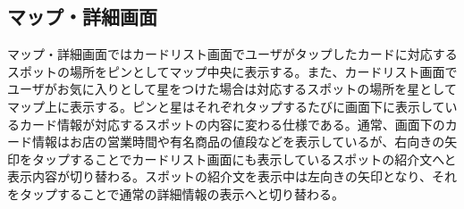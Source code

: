 \subsection{マップ・詳細画面}
マップ・詳細画面ではカードリスト画面でユーザがタップしたカードに対応するスポットの場所をピンとしてマップ中央に表示する。また、カードリスト画面でユーザがお気に入りとして星をつけた場合は対応するスポットの場所を星としてマップ上に表示する。ピンと星はそれぞれタップするたびに画面下に表示しているカード情報が対応するスポットの内容に変わる仕様である。通常、画面下のカード情報はお店の営業時間や有名商品の値段などを表示しているが、右向きの矢印をタップすることでカードリスト画面にも表示しているスポットの紹介文へと表示内容が切り替わる。スポットの紹介文を表示中は左向きの矢印となり、それをタップすることで通常の詳細情報の表示へと切り替わる。

\addtocounter{figure}{+1}
